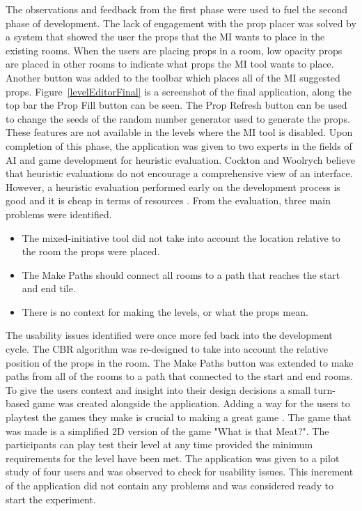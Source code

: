 \documentclass[journal]{IEEEtran}
\begin{document}
The observations and feedback from the first phase were used to fuel the second phase of development. The lack of engagement with the prop placer was solved by a system that showed the user the props that the MI wants to place in the existing rooms. When the users are placing props in a room, low opacity props are placed in other rooms to indicate what props the MI tool wants to place. Another button was added to the toolbar which places all of the MI suggested props. Figure~\ref{levelEditorFinal} is a screenshot of the final application, along the top bar the Prop Fill button can be seen. The Prop Refresh button can be used to change the seeds of the random number generator used to generate the props. These features are not available in the levels where the MI tool is disabled. Upon completion of this phase, the application was given to two experts in the fields of AI and game development for heuristic evaluation.  Cockton and Woolrych\cite{cockton2002sale} believe that heuristic evaluations do not encourage a comprehensive view of an interface. However, a heuristic evaluation performed early on the development process is good \cite{nielsen1990heuristic} and it is cheap in terms of resources \cite{nielsen1990heuristic}. From the evaluation, three main problems were identified.
\begin{itemize}
\item The mixed-initiative tool did not take into account the location relative to the room the props were placed.
\item The Make Paths should connect all rooms to a path that reaches the start and end tile.
\item There is no context for making the levels, or what the props mean.
\end{itemize}

The usability issues identified were once more fed back into the development cycle. The CBR algorithm was re-designed to take into account the relative position of the props in the room. The Make Paths button was extended to make paths from all of the rooms to a path that connected to the start and end rooms. To give the users context and insight into their design decisions a small turn-based game was created alongside the application. Adding a way for the users to playtest the games they make is crucial to making a great game \cite{winn2006resolving}. The game that was made is a simplified  2D version of the game "What is that Meat?". The participants can play test their level at any time provided the minimum requirements for the level have been met. The application was given to a pilot study of four users and was observed to check for usability issues. This increment of the application did not contain any problems and was considered ready to start the experiment.
\end{document}
